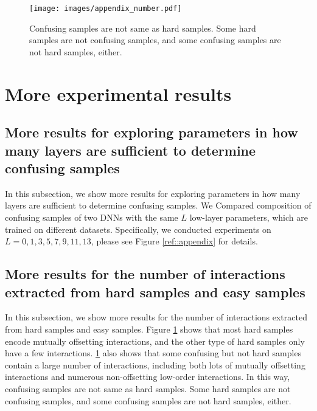 \documentclass[10pt,twocolumn,letterpaper]{article}
\begin{document}
\begin{figure}[t]
    \centering
    \texttt{[image: images/appendix\_number.pdf]}
    \caption{Confusing samples are not same as hard samples. Some hard samples are not confusing samples, and some confusing samples are not hard samples, either.}
    \label{ref::appendix_number}
\end{figure}

\section{More experimental results
}\label{sec:more-result}
\subsection{More results for exploring parameters in how many layers are sufficient to determine confusing samples}
In this subsection, we show more results for exploring parameters in how many layers are sufficient to determine confusing samples. We Compared composition of confusing samples of two DNNs with the same $L$ low-layer parameters, which are trained on different datasets. Specifically, we conducted experiments on $L=0, 1, 3, 5, 7, 9, 11, 13$,  please see Figure \ref{ref::appendix} for details.

\subsection{More results for the number of interactions extracted from hard samples and easy samples}
In this subsection, we show more results for the number of interactions extracted from hard samples and easy samples. Figure \ref{ref::appendix_number} shows that most hard samples encode mutually offsetting interactions, and the other type of hard samples only have a few interactions. \ref{ref::appendix_number} also shows that some confusing but not hard samples contain a large number of interactions, including both lots of mutually offsetting interactions and numerous non-offsetting low-order interactions. In this way, confusing samples are not same as hard samples. Some hard samples are not confusing samples, and some confusing samples are not hard samples, either.




\end{document}
